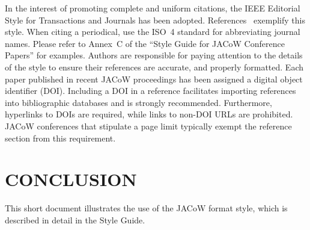 \documentclass[%
               biblatex,     %
               ]{jacow}
\begin{document}
In the interest of promoting complete and uniform citations, 
the IEEE Editorial Style for Transactions and Journals has been adopted. 
References~\cite{ref:jacow-paper, ref:journal-paper} exemplify this style. 
When citing a periodical, use the ISO~4 standard for abbreviating journal names. 
Please refer to Annex~C of the “Style Guide for JACoW Conference Papers” for examples. 
Authors are responsible for paying attention to the details of the style to ensure their references are 
accurate, and properly formatted. 
Each paper published in recent JACoW proceedings has been assigned a digital object identifier (DOI). Including a DOI in a reference facilitates importing references into bibliographic databases and is strongly recommended. 
Furthermore, hyperlinks to DOIs are required, while links to non-DOI URLs are prohibited. 
JACoW conferences that stipulate a page limit typically exempt the reference section from this requirement.

\section{CONCLUSION}

This short document illustrates the use of the JACoW format style, which is described in detail in the Style Guide. 

\printbibliography
\end{document}
